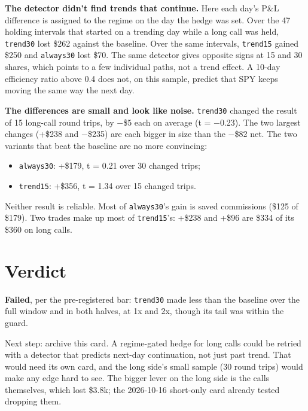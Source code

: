 \documentclass{article}
\begin{document}
\textbf{The detector didn't find trends that continue.} Here each day's P\&L difference is assigned to the regime on the day the hedge was set. Over the 47 holding intervals that started on a trending day while a long call was held, \texttt{trend30} lost \$262 against the baseline. Over the same intervals, \texttt{trend15} gained \$250 and \texttt{always30} lost \$70. The same detector gives opposite signs at 15 and 30 shares, which points to a few individual paths, not a trend effect. A 10-day efficiency ratio above 0.4 does not, on this sample, predict that SPY keeps moving the same way the next day.

\textbf{The differences are small and look like noise.} \texttt{trend30} changed the result of 15 long-call round trips, by \ensuremath{-}\$5 each on average (t = \ensuremath{-}0.23). The two largest changes (+\$238 and \ensuremath{-}\$235) are each bigger in size than the \ensuremath{-}\$82 net. The two variants that beat the baseline are no more convincing:

\begin{itemize}

\item \texttt{always30}: +\$179, t = 0.21 over 30 changed trips;

\item \texttt{trend15}: +\$356, t = 1.34 over 15 changed trips.

\end{itemize}

Neither result is reliable. Most of \texttt{always30}'s gain is saved commissions (\$125 of \$179). Two trades make up most of \texttt{trend15}'s: +\$238 and +\$96 are \$334 of its \$360 on long calls.

\section{Verdict}

\textbf{Failed}, per the pre-registered bar: \texttt{trend30} made less than the baseline over the full window and in both halves, at 1x and 2x, though its tail was within the guard.

Next step: archive this card. A regime-gated hedge for long calls could be retried with a detector that predicts next-day continuation, not just past trend. That would need its own card, and the long side's small sample (30 round trips) would make any edge hard to see. The bigger lever on the long side is the calls themselves, which lost \$3.8k; the 2026-10-16 short-only card already tested dropping them.
\end{document}
